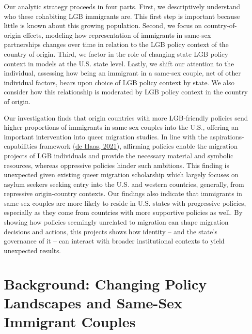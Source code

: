 \documentclass[
  12pt,
]{article}
\begin{document}
Our analytic strategy proceeds in four parts. First, we descriptively understand who these cohabiting LGB immigrants are. This first step is important because little is known about this growing population. Second, we focus on country-of-origin effects, modeling how representation of immigrants in same-sex partnerships changes over time in relation to the LGB policy context of the country of origin. Third, we factor in the role of changing state LGB policy context in models at the U.S. state level. Lastly, we shift our attention to the individual, assessing how being an immigrant in a same-sex couple, net of other individual factors, bears upon choice of LGB policy context by state. We also consider how this relationship is moderated by LGB policy context in the country of origin.

Our investigation finds that origin countries with more LGB-friendly policies send higher proportions of immigrants in same-sex couples into the U.S., offering an important intervention into queer migration studies. In line with the aspirations-capabilities framework (\protect\hyperlink{ref-dehaas_2021}{de Haas, 2021}), affirming policies enable the migration projects of LGB individuals and provide the necessary material and symbolic resources, whereas oppressive policies hinder such ambitions. This finding is unexpected given existing queer migration scholarship which largely focuses on asylum seekers seeking entry into the U.S. and western countries, generally, from repressive origin-country contexts. Our findings also indicate that immigrants in same-sex couples are more likely to reside in U.S. states with progressive policies, especially as they come from countries with more supportive policies as well. By showing how policies seemingly unrelated to migration can shape migration decisions and actions, this projects shows how identity -- and the state's governance of it -- can interact with broader institutional contexts to yield unexpected results.

\hypertarget{background-changing-policy-landscapes-and-same-sex-immigrant-couples}{%
\section{Background: Changing Policy Landscapes and Same-Sex Immigrant Couples}\label{background-changing-policy-landscapes-and-same-sex-immigrant-couples}}
\end{document}
